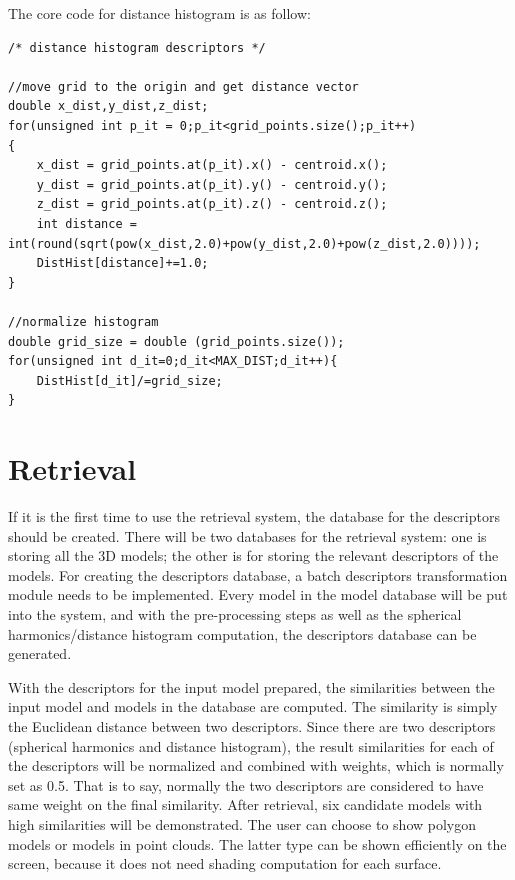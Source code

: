 The core code for distance histogram is as follow: 

\begin{lstlisting}[xleftmargin=0em]
/* distance histogram descriptors */

//move grid to the origin and get distance vector
double x_dist,y_dist,z_dist;
for(unsigned int p_it = 0;p_it<grid_points.size();p_it++)
{
	x_dist = grid_points.at(p_it).x() - centroid.x();
	y_dist = grid_points.at(p_it).y() - centroid.y();
	z_dist = grid_points.at(p_it).z() - centroid.z();
	int distance = int(round(sqrt(pow(x_dist,2.0)+pow(y_dist,2.0)+pow(z_dist,2.0))));
	DistHist[distance]+=1.0;
}

//normalize histogram
double grid_size = double (grid_points.size());
for(unsigned int d_it=0;d_it<MAX_DIST;d_it++){
	DistHist[d_it]/=grid_size;
}
\end{lstlisting}

\section{Retrieval}

If it is the first time to use the retrieval system, the database for the descriptors should be created. There will be two databases for the retrieval system: one is storing all the 3D models; the other is for storing the relevant descriptors of the models. For creating the descriptors database, a batch descriptors transformation module needs to be implemented. Every model in the model database will be put into the system, and with the pre-processing steps as well as the spherical harmonics/distance histogram computation, the descriptors database can be generated.

With the descriptors for the input model prepared, the similarities between the input model and models in the database are computed. The similarity is simply the Euclidean distance between two descriptors. Since there are two descriptors (spherical harmonics and distance histogram), the result similarities for each of the descriptors will be normalized and combined with weights, which is normally set as 0.5. That is to say, normally the two descriptors are considered to have same weight on the final similarity. After retrieval, six candidate models with high similarities will be demonstrated.  The user can choose to show polygon models or models in point clouds. The latter type can be shown efficiently on the screen, because it does not need shading computation for each surface.  



